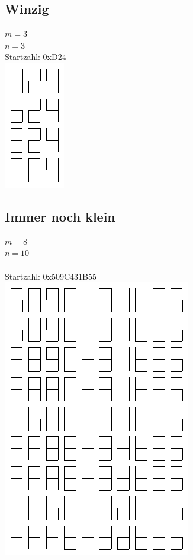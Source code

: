\documentclass[a4paper,10pt,ngerman]{scrartcl}
\begin{document}
\subsection{Winzig}

$m=3$
\\
$n=3$
\\
Startzahl: 0xD24
\\
\includegraphics[scale=.5]{solutions/hexmax0.png}

\subsection{Immer noch klein}

$m=8$
\\
$n=10$
\\
\\
Startzahl: 0x509C431B55
\\
\includegraphics[scale=.5]{solutions/hexmax1.png}
\end{document}
